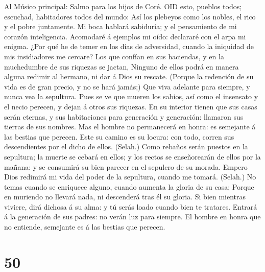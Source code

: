  Al Músico principal: Salmo para los hijos de Coré. OID
esto, pueblos todos; escuchad, habitadores todos del mundo: 
Así los plebeyos como los nobles, el rico y el pobre juntamente.
 Mi boca hablará sabiduría; y el pensamiento de mi corazón
inteligencia.  Acomodaré á ejemplos mi oído: declararé con
el arpa mi enigma.  ¿Por qué he de temer en los días de
adversidad, cuando la iniquidad de mis insidiadores me cercare?
 Los que confían en sus haciendas, y en la muchedumbre de
sus riquezas se jactan,  Ninguno de ellos podrá en manera
alguna redimir al hermano, ni dar á Dios su rescate. 
(Porque la redención de su vida es de gran precio, y no se hará jamás;)
 Que viva adelante para siempre, y nunca vea la sepultura.
 Pues se ve que mueren los sabios, así como el insensato y
el necio perecen, y dejan á otros sus riquezas.  En su
interior tienen que sus casas serán eternas, y sus habitaciones para
generación y generación: llamaron sus tierras de sus nombres.
 Mas el hombre no permanecerá en honra: es semejante á las
bestias que perecen.  Este su camino es su locura: con
todo, corren sus descendientes por el dicho de ellos. (Selah.)
 Como rebaños serán puestos en la sepultura; la muerte se
cebará en ellos; y los rectos se enseñorearán de ellos por la mañana: y
se consumirá su bien parecer en el sepulcro de su morada. 
Empero Dios redimirá mi vida del poder de la sepultura, cuando me
tomará. (Selah.)  No temas cuando se enriquece alguno,
cuando aumenta la gloria de su casa;  Porque en muriendo no
llevará nada, ni descenderá tras él su gloria.  Si bien
mientras viviere, dirá dichosa á su alma: y tú serás loado cuando bien
te tratares.  Entrará á la generación de sus padres: no
verán luz para siempre.  El hombre en honra que no
entiende, semejante es á las bestias que perecen.

\hypertarget{section-49}{%
\section{50}\label{section-49}}

